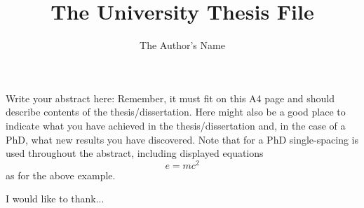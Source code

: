 \documentclass[12pt,MSc,twoside]{muthesis}
\numberwithin{equation}{chapter}															%
\begin{document}
\title{The University Thesis File}
\author{The Author's Name}

\def\wordcount{nnnnn}


\beforeabstract
Write your abstract here: Remember, it must fit on this A4 page and should describe contents of the thesis/dissertation. Here might also be a good place to indicate what you have achieved in the thesis/dissertation and, in the case of a PhD, what new results you have discovered. Note that for a PhD single-spacing is used throughout the abstract, including displayed equations \[e = mc^{2}\] as for the above example.
\afterabstract


I would like to thank...
\afterpreface																																				%

\raggedright          																															%


 

\printbibliography

\end{document}
